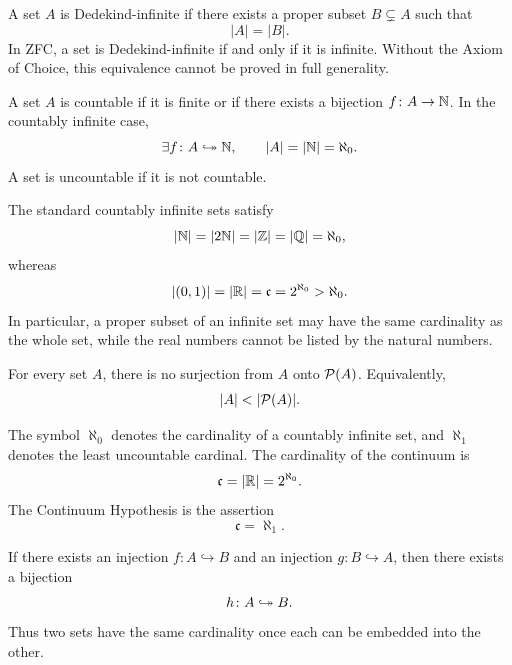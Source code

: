     \begin{definition}
        A set $A$ is Dedekind-infinite if there exists a proper subset
        $B\subsetneq A$ such that
        \[
            |A|=|B|.
        \]
        In ZFC, a set is Dedekind-infinite if and only if it is infinite. Without
        the Axiom of Choice, this equivalence cannot be proved in full
        generality.
    \end{definition}

    \begin{definition}[Countability]
        A set $A$ is countable if it is finite or if there exists a bijection
        $f\colon A\to\mathbb{N}$. In the countably infinite case,
        \[
            \exists f\colon A\bijarrow\N,
            \qquad
            |A|=|\N|=\aleph_0.
        \]
        A set is uncountable if it is not countable.
    \end{definition}

    \begin{theorem}
        The standard countably infinite sets satisfy
        \[
            |\mathbb{N}|=|2\mathbb{N}|=|\mathbb{Z}|=|\mathbb{Q}|=\aleph_0,
        \]
        whereas
        \[
            |(0,1)|=|\mathbb{R}|=\mathfrak{c}=2^{\aleph_0}>\aleph_0.
        \]
        In particular, a proper subset of an infinite set may have the same
        cardinality as the whole set, while the real numbers cannot be listed by
        the natural numbers.
    \end{theorem}


    \begin{theorem}
        For every set $A$, there is no surjection from $A$ onto $\mathcal{P}(A)$.
        Equivalently,
        \[
            |A|<|\Pow(A)|.
        \]
    \end{theorem}

    \begin{definition}
        The symbol $\aleph_0$ denotes the cardinality of a countably infinite
        set, and $\aleph_1$ denotes the least uncountable cardinal. The
        cardinality of the continuum is
        \[
            \mathfrak{c}=|\mathbb{R}|=2^{\aleph_0}.
        \]
        The Continuum Hypothesis is the assertion
        \[
            \mathfrak{c}=\aleph_1.
        \]
    \end{definition}

    \begin{theorem}
        If there exists an injection $f\colon A\hookrightarrow B$ and an injection
        $g\colon B\hookrightarrow A$, then there exists a bijection
        \[
            h\colon A\bijarrow B.
        \]
        Thus two sets have the same cardinality once each can be embedded into
        the other.
    \end{theorem}

